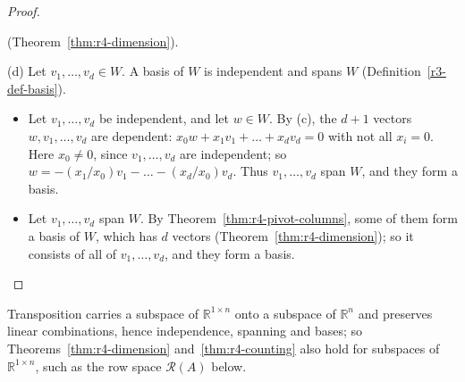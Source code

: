 \documentclass[12pt]{article}
\newcommand{\R}{\mathbb R}
\theoremstyle{definition}
\begin{document}
\begin{proof}
\begin{itemize}
(Theorem~\ref{thm:r4-dimension}).
\end{itemize}
(d) Let \(v_1,\dots,v_d\in W\). A basis of \(W\) is independent and spans \(W\)
(Definition~\ref{r3-def-basis}).
\begin{itemize}
\item Let \(v_1,\dots,v_d\) be independent, and let \(w\in W\). By (c), the \(d+1\) vectors
\(w,v_1,\dots,v_d\) are dependent: \(x_0w+x_1v_1+\dots+x_dv_d=0\) with not all \(x_i=0\). Here
\(x_0\ne0\), since \(v_1,\dots,v_d\) are independent; so \(w=-(x_1/x_0)v_1-\dots-(x_d/x_0)v_d\). Thus
\(v_1,\dots,v_d\) span \(W\), and they form a basis.
\item Let \(v_1,\dots,v_d\) span \(W\). By Theorem~\ref{thm:r4-pivot-columns}, some of them form a basis of
\(W\), which has \(d\) vectors (Theorem~\ref{thm:r4-dimension}); so it consists of all of
\(v_1,\dots,v_d\), and they form a basis.\qedhere
\end{itemize}
\end{proof}

Transposition carries a subspace of \(\R^{1\times n}\) onto a subspace of \(\R^n\) and preserves linear
combinations, hence independence, spanning and bases; so Theorems~\ref{thm:r4-dimension}
and~\ref{thm:r4-counting} also hold for subspaces of \(\R^{1\times n}\), such as the row space
\(\mathcal R(A)\) below.
\end{document}

